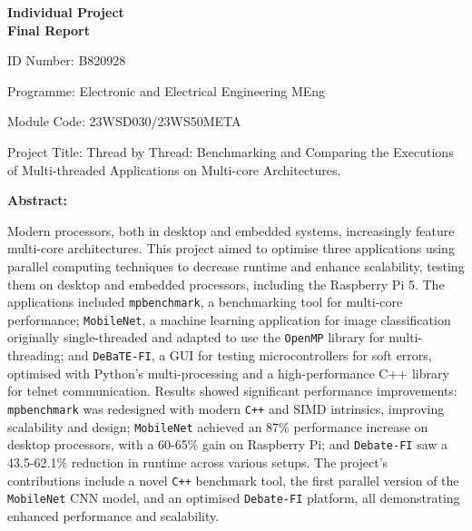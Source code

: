 \documentclass[12pt, openany]{book}
\begin{document}
\begin{titlepage}
	\centering
	\vspace*{1cm} %
	{\Huge\bfseries Individual Project\\[0.5cm] Final Report\par}
	\vspace{2cm}
	\raggedright
	ID Number: B820928\par
	
	Programme: Electronic and Electrical Engineering MEng\par
	
	Module Code: 23WSD030/23WS50META\par
	
	Project Title: Thread by Thread: Benchmarking and Comparing the Executions of Multi-threaded Applications on Multi-core Architectures.\par
	
	\textbf{Abstract:}\par %

	Modern processors, both in desktop and embedded systems, increasingly feature multi-core architectures. This project aimed to optimise three applications using parallel computing techniques to decrease runtime and enhance scalability, testing them on desktop and embedded processors, including the Raspberry Pi 5. The applications included \texttt{mpbenchmark}, a benchmarking tool for multi-core performance; \texttt{MobileNet}, a machine learning application for image classification originally single-threaded and adapted to use the \texttt{OpenMP} library for multi-threading; and \texttt{DeBaTE-FI}, a GUI for testing microcontrollers for soft errors, optimised with Python’s multi-processing and a high-performance C++ library for telnet communication. Results showed significant performance improvements: \texttt{mpbenchmark} was redesigned with modern \texttt{C++} and SIMD intrinsics, improving scalability and design; \texttt{MobileNet} achieved an 87\% performance increase on desktop processors, with a 60-65\% gain on Raspberry Pi; and \texttt{Debate-FI} saw a 43.5-62.1\% reduction in runtime across various setups. The project's contributions include a novel \texttt{C++} benchmark tool, the first parallel version of the \texttt{MobileNet} CNN model, and an optimised \texttt{Debate-FI} platform, all demonstrating enhanced performance and scalability.

\end{titlepage}
\end{document}
